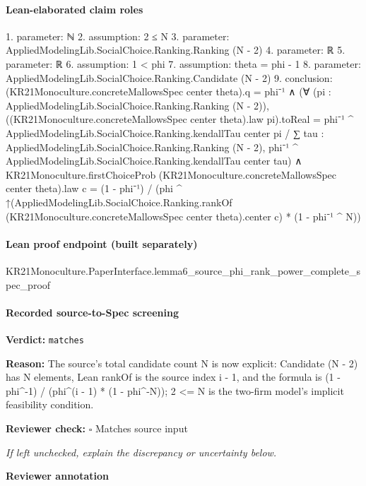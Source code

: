 \documentclass[10pt]{article}
\newcommand{\reviewerbox}{%
  \par\noindent\fbox{\parbox{0.96\linewidth}{\rule{0pt}{0.38in}}}\par
}
\newcommand{\reviewmatch}[1]{%
  \par\noindent\textbf{Reviewer check:} $\square$\; #1\par
  \noindent\emph{If left unchecked, explain the discrepancy or uncertainty below.}\par
}
\begin{document}
\paragraph{Lean-elaborated claim roles}\begin{ReviewVerbatim}
1. parameter: ℕ
2. assumption: 2 ≤ N
3. parameter: AppliedModelingLib.SocialChoice.Ranking.Ranking (N - 2)
4. parameter: ℝ
5. parameter: ℝ
6. assumption: 1 < phi
7. assumption: theta = phi - 1
8. parameter: AppliedModelingLib.SocialChoice.Ranking.Candidate (N - 2)
9. conclusion: (KR21Monoculture.concreteMallowsSpec center theta).q = phi⁻¹ ∧
  (∀ (pi : AppliedModelingLib.SocialChoice.Ranking.Ranking (N - 2)),
      ((KR21Monoculture.concreteMallowsSpec center theta).law pi).toReal =
        phi⁻¹ ^ AppliedModelingLib.SocialChoice.Ranking.kendallTau center pi /
          ∑ tau : AppliedModelingLib.SocialChoice.Ranking.Ranking (N - 2),
            phi⁻¹ ^ AppliedModelingLib.SocialChoice.Ranking.kendallTau center tau) ∧
    KR21Monoculture.firstChoiceProb (KR21Monoculture.concreteMallowsSpec center theta).law c =
      (1 - phi⁻¹) /
        (phi ^
            ↑(AppliedModelingLib.SocialChoice.Ranking.rankOf (KR21Monoculture.concreteMallowsSpec center theta).center
                c) *
          (1 - phi⁻¹ ^ N))
\end{ReviewVerbatim}

\paragraph{Lean proof endpoint (built separately)}\begin{ReviewVerbatim}
KR21Monoculture.PaperInterface.lemma6_source_phi_rank_power_complete_spec_proof
\end{ReviewVerbatim}

\paragraph{Recorded source-to-Spec screening}
\textbf{Verdict:} \texttt{matches}
\\
{\raggedright
\textbf{Reason:} The source's total candidate count N is now explicit:\allowbreak{} Candidate (N -\allowbreak{} 2) has N elements, Lean rankOf is the source index i -\allowbreak{} 1, and the formula is (1 -\allowbreak{} phi\textasciicircum{}-\allowbreak{}1) /\allowbreak{} (phi\textasciicircum{}(i -\allowbreak{} 1) * (1 -\allowbreak{} phi\textasciicircum{}-\allowbreak{}N));\allowbreak{} 2 <= N is the two-\allowbreak{}firm model's implicit feasibility condition.\allowbreak{}
\par}
\reviewmatch{Matches source input}
\noindent\textbf{Reviewer annotation}\par
\reviewerbox
\clearpage
\hypertarget{source-claim-4e3a949fd1ab09f3}{}
\end{document}
